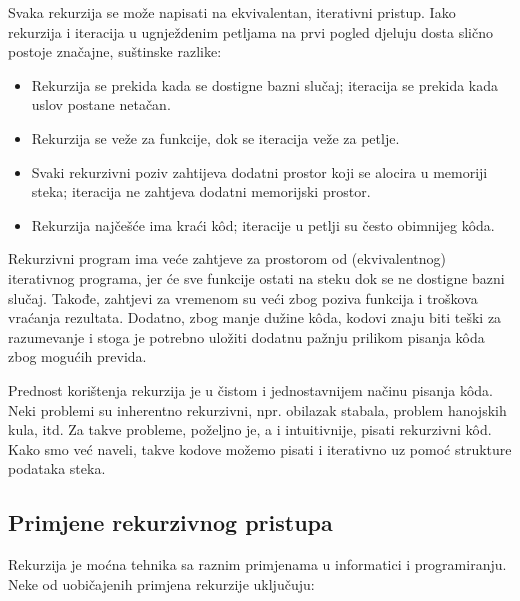 Svaka rekurzija se može napisati na ekvivalentan, iterativni pristup. 
Iako rekurzija i iteracija u ugnježdenim petljama na prvi pogled djeluju dosta slično postoje značajne, suštinske razlike:
\begin{itemize}
	\item Rekurzija se prekida kada se dostigne bazni slučaj; iteracija se prekida kada uslov postane netačan.
	\item Rekurzija se veže za funkcije, dok se iteracija veže za petlje.
	\item Svaki rekurzivni poziv zahtijeva dodatni prostor koji se alocira u memoriji steka; iteracija ne zahtjeva dodatni memorijski prostor.
	\item Rekurzija najčešće ima kraći k\^od; iteracije u petlji su često obimnijeg k\^oda. 
	
\end{itemize}



Rekurzivni program ima veće zahtjeve za prostorom od (ekvivalentnog) iterativnog programa, jer će sve funkcije ostati na steku dok se ne dostigne bazni slučaj. Takođe,  zahtjevi za vremenom su veći zbog poziva funkcija i   troškova vraćanja rezultata. Dodatno, zbog manje dužine k\^oda, kodovi znaju biti teški za razumevanje i stoga je potrebno uložiti  dodatnu pažnju prilikom pisanja k\^oda zbog mogućih previda. %

Prednost korištenja rekurzija je u čistom i jednostavnijem načinu pisanja k\^oda. Neki problemi su inherentno rekurzivni, npr. obilazak stabala, problem hanojskih kula, itd. Za takve probleme, poželjno je, a i intuitivnije,  pisati rekurzivni k\^od. Kako smo već naveli, takve kodove možemo pisati i iterativno uz pomoć strukture podataka steka.

\subsection{Primjene rekurzivnog pristupa}

Rekurzija je moćna tehnika sa raznim primjenama u informatici i programiranju. Neke od uobičajenih primjena rekurzije uključuju:

